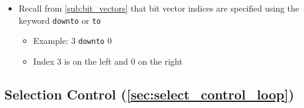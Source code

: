 \begin{itemize}
\begin{itemize}
	\item Recall from \ref{sub:bit_vectors} that bit vector indices are specified using the keyword \verb|downto| or \verb|to|
	

	
		\begin{itemize}
		\item Example: 3 \verb|downto| 0
		
		\item Index 3 is on the left and 0 on the right
		\end{itemize}
	
	\end{itemize}

\end{itemize}

\subsection{Selection Control (\ref{sec:select_control_loop})}

